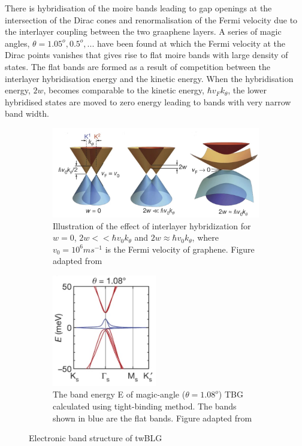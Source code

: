There is hybridisation of the moire bands leading to gap openings at the intersection of the Dirac cones and renormalisation of the Fermi velocity due to the interlayer coupling between the two graaphene layers. A series of magic angles, $\theta=1.05^o, 0.5^o, ...$ have been found at which the Fermi velocity at the Dirac points vanishes that gives rise to flat moire bands with large density of states. The flat bands are formed as a result of competition between the interlayer hybridisation energy and the kinetic energy. When the hybridisation energy, $2w$, becomes comparable to the kinetic energy, $\hbar v_Fk_\theta$, the lower hybridised states are moved to zero energy leading to bands with very narrow band width.
\begin{figure}[H]
     \centering
     \begin{subfigure}[b]{0.8\textwidth}
         \centering
         \includegraphics[width=\textwidth]{figures/twblg_hyb.jpg}
         \caption{Illustration of the effect of interlayer hybridization for $w=0$, $2w<<\hbar v_0 k_\theta$ and $2w\approx \hbar v_0 k_\theta$, where $v_0=10^6ms^{-1}$ is the Fermi velocity of graphene. Figure adapted from \cite{Cao2018}}
     \end{subfigure}
     
     \begin{subfigure}[b]{0.8\textwidth}
         \centering
         \includegraphics[width=0.5\textwidth]{figures/flatband.jpg}
         \caption{The band energy E of magic-angle ($\theta=1.08^o$) TBG calculated using tight-binding method. The bands shown in blue are the flat bands. Figure adapted from \cite{Cao2018}}
     \end{subfigure}
\caption{Electronic band structure of twBLG}
\end{figure}

